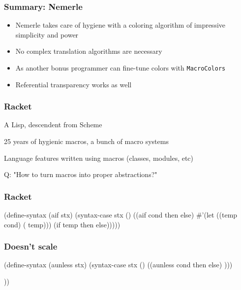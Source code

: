 \documentclass[hyperref={bookmarks=false}]{beamer}
\begin{document}
\begin{frame}[fragile]
\frametitle{Summary: Nemerle}
\begin{itemize}
\item Nemerle takes care of hygiene with a coloring algorithm of impressive simplicity and power
\item No complex translation algorithms are necessary
\item As another bonus programmer can fine-tune colors with \texttt{MacroColors}
\item Referential transparency works as well
\end{itemize}
\end{frame}

\begin{frame}[fragile]
\frametitle{Racket}
A Lisp, descendent from Scheme

25 years of hygienic macros, a bunch of macro systems

Language features written using macros (classes, modules, etc)

Q: "How to turn macros into proper abstractions?"
\end{frame}

\begin{frame}[fragile]
\frametitle{Racket}
\begin{semiverbatim}

(define-syntax (aif stx)
  (syntax-case stx ()
    ((aif cond then else)
       #'(let ((temp cond)
               ( temp)))
           (if temp then else)))))

\end{semiverbatim}
\end{frame}

\begin{frame}[fragile]
\frametitle{Doesn't scale}
\begin{semiverbatim}

(define-syntax (aunless stx)
  (syntax-case stx ()
    ((aunless cond then else)
     )))

        
    ))
\end{semiverbatim}
\end{frame}
\end{document}

